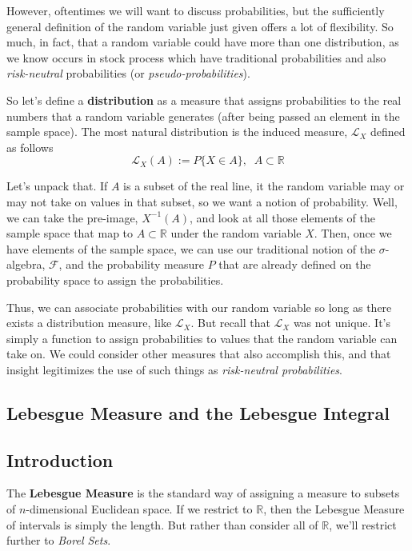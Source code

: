 \documentclass[12pt]{article}
\theoremstyle{plain}
\theoremstyle{definition}
\theoremstyle{remark}
\begin{document}
However, oftentimes we will want to discuss probabilities, but the sufficiently general definition of the random variable just given
offers a lot of flexibility.  So much, in fact, that a random variable could have more than one distribution, as we know occurs in
stock process which have traditional probabilities and also \emph{risk-neutral} probabilities (or \emph{pseudo-probabilities}).

So let's define a \textbf{distribution} as a measure that assigns probabilities to the real numbers that a random variable generates
(after being passed an element in the sample space).  The most natural distribution is the induced measure, $\mathcal{L}_X$ defined
as follows
\[ \mathcal{L}_X(A) := P \{ X \in A \}, \;\; A \subset \mathbb{R} \]

Let's unpack that. If $A$ is a subset of the real line, it the random variable may or may not take on values in that subset, so we want
a notion of probability.  Well, we can take the pre-image, $X^{-1}(A)$, and look at all those elements of the sample space that map to
$A \subset \mathbb{R}$ under the random variable $X$.  Then, once we have elements of the sample space, we can use our traditional notion
of the $\sigma$-algebra, $\mathcal{F}$, and the probability measure $P$ that are already defined on the probability space to assign
the probabilities.

Thus, we can associate probabilities with our random variable so long as there exists a distribution measure, like $\mathcal{L}_X$.
But recall that $\mathcal{L}_X$ was not unique.  It's simply a function to assign probabilities to values that the random variable can
take on.  We could consider other measures that also accomplish this, and that insight legitimizes the use of such things as
\emph{risk-neutral probabilities}.

\subsection{Lebesgue Measure and the Lebesgue Integral}

\subsection{Introduction}

The \textbf{Lebesgue Measure} is the standard way of assigning a measure to subsets of $n$-dimensional Euclidean space.  If we restrict
to $\mathbb{R}$, then the Lebesgue Measure of intervals is simply the length. But rather than consider all of $\mathbb{R}$, we'll
restrict further to \emph{Borel Sets}.
\end{document}
